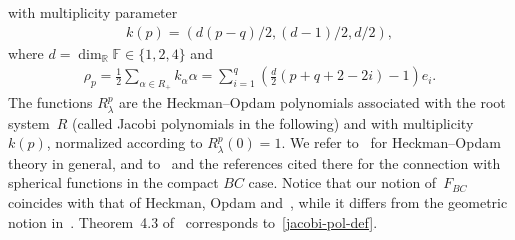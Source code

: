 \documentclass[11pt]{article}
\numberwithin{equation}{section}
\begin{document}
with multiplicity parameter
\begin{gather}
\label{multipl}
k(p)=(d(p-q)/2, (d-1)/2, d/2),
\end{gather}
where $d=\dim_\mathbb R \mathbb F \in \{1,2,4\}$ and
\begin{gather*}
\rho_p=\frac{1}{2}\sum\limits_{\alpha\in R_+} k_\alpha\alpha=\sum\limits_{i=1}^q \left(\frac{d}{2}(p+q+2-2i) -1\right)e_i.
\end{gather*}
The functions $R_\lambda^p$ are the Heckman--Opdam polynomials associated with the root system~$R$ (called Jacobi
polynomials in the following) and with multiplicity $k(p)$, normalized according to $R_\lambda^p(0)=1$.
We refer to~\cite{H,HS,O1} for Heckman--Opdam theory in general, and to~\cite{RR} and the references
cited there for the connection with spherical functions in the compact $BC$ case.
Notice that our notion of~$F_{BC}$ coincides with that of Heckman, Opdam and~\cite{R2,RV2}, while it dif\/fers
from the geometric notion in~\cite{RR}.
Theorem~4.3 of~\cite{RR} corresponds to~\eqref{jacobi-pol-def}.
\end{document}
